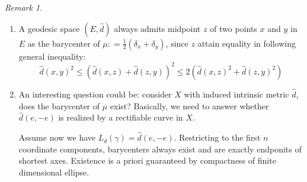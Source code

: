 \documentclass{report}
\theoremstyle{remark}
\newtheorem{rmk}{Remark}
\theoremstyle{definition}
\begin{document}
\begin{rmk}
\begin{enumerate}
		\item A geodesic space $(E, \hat{d})$ always admits midpoint $z$ of two points $x$ and $y$ in $E$ as the barycenter of $\mu : = \frac{1}{2} (\delta_x + \delta_y)$, since $z$ attain equality in following general inequality:
		      \[
			      \hat{d}(x,y)^2 \leq \left(\hat{d}(x,z) + \hat{d}(z,y)\right)^2 \leq 2\left(\hat{d}(x,z)^2+ \hat{d}(z,y)^2\right)
		      \]
		\item An interesting question could be: consider $X$ with induced intrinsic metric $\hat{d}$, does the barycenter of $\mu$ exist?
		      Basically, we need to answer whether $\hat{d}(e,-e)$ is realized by a rectifiable curve in $X$.

		      Assume now we have $L_{d}(\gamma)=\hat{d}(e,-e)$.
		      Restricting to the first $n$ coordinate components, barycenters always exist and are exactly endponits of shortest axes. Existence is a priori guaranteed by compactness of finite dimensional ellipse.


\end{enumerate}
\end{rmk}
\end{document}
